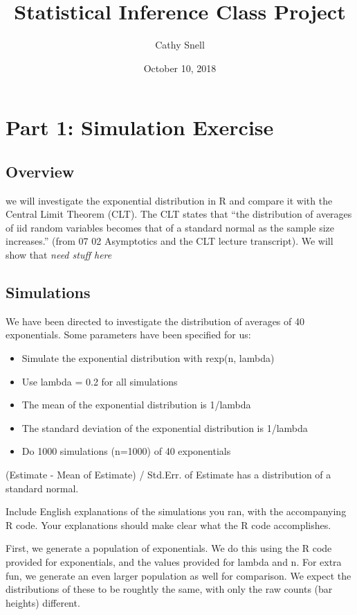 \documentclass[]{article}
\title{Statistical Inference Class Project}
\author{Cathy Snell}
\date{October 10, 2018}
\providecommand{\tightlist}{%
  \setlength{\itemsep}{0pt}\setlength{\parskip}{0pt}}
\begin{document}
\maketitle

\section{Part 1: Simulation Exercise}\label{part-1-simulation-exercise}

\subsection{Overview}\label{overview}

we will investigate the exponential distribution in R and compare it
with the Central Limit Theorem (CLT). The CLT states that ``the
distribution of averages of iid random variables becomes that of a
standard normal as the sample size increases.'' (from 07 02 Asymptotics
and the CLT lecture transcript). We will show that \emph{need stuff
here}

\subsection{Simulations}\label{simulations}

We have been directed to investigate the distribution of averages of 40
exponentials. Some parameters have been specified for us:

\begin{itemize}
\tightlist
\item
  Simulate the exponential distribution with rexp(n, lambda)
\item
  Use lambda = 0.2 for all simulations
\item
  The mean of the exponential distribution is 1/lambda
\item
  The standard deviation of the exponential distribution is 1/lambda
\item
  Do 1000 simulations (n=1000) of 40 exponentials
\end{itemize}

(Estimate - Mean of Estimate) / Std.Err. of Estimate has a distribution
of a standard normal.

Include English explanations of the simulations you ran, with the
accompanying R code. Your explanations should make clear what the R code
accomplishes.

First, we generate a population of exponentials. We do this using the R
code provided for exponentials, and the values provided for lambda and
n. For extra fun, we generate an even larger population as well for
comparison. We expect the distributions of these to be roughtly the
same, with only the raw counts (bar heights) different.
\end{document}
